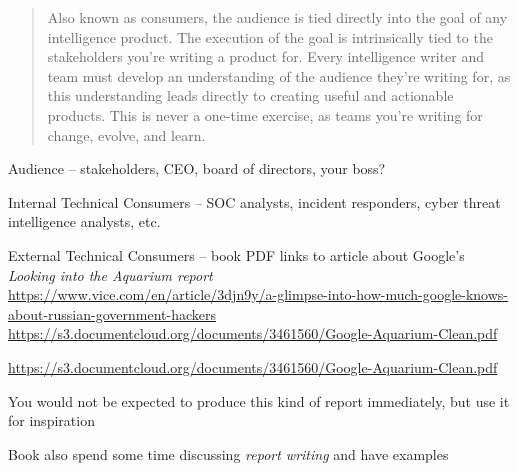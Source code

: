 \documentclass[Screen16to9,17pt]{foils}
\begin{document}


\begin{quote}
Also known as consumers, the audience is tied directly into the goal of any intelligence
product. The execution of the goal is intrinsically tied to the stakeholders you’re writing a product for. Every intelligence writer and team must develop an understanding
of the audience they’re writing for, as this understanding leads directly to creating
useful and actionable products. This is never a one-time exercise, as teams you’re
writing for change, evolve, and learn.
\end{quote}

\begin{list2}
\item Audience -- stakeholders, CEO, board of directors, your boss?
\item Internal Technical Consumers -- SOC analysts, incident responders,
cyber threat intelligence analysts, etc.
\item External Technical Consumers -- book PDF links to article about Google’s \emph{Looking into the Aquarium report}\\
\url{https://www.vice.com/en/article/3djn9y/a-glimpse-into-how-much-google-knows-about-russian-government-hackers}\\
\url{https://s3.documentcloud.org/documents/3461560/Google-Aquarium-Clean.pdf}
\end{list2}




\url{https://s3.documentcloud.org/documents/3461560/Google-Aquarium-Clean.pdf}

\begin{list2}
\item You would not be expected to produce this kind of report immediately, but use it for inspiration
\item Book also spend some time discussing \emph{report writing} and have examples
\end{list2}



\end{document}

